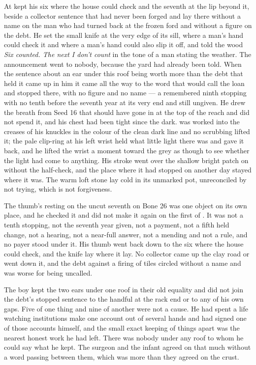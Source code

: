 At   kept his six where the house could check and the seventh at the lip beyond it, beside a collector sentence that had never been forged and lay there without a name on the man who had turned back at the frozen ford and without a figure on the debt. He set the small knife at the very edge of its sill, where a man's hand could check it and where a man's hand could also slip it off, and told the wood \emph{Six counted. The next I don't count} in the tone of a man stating the weather. The announcement went to nobody, because the yard had already been told. When the sentence about an ear under this roof being worth more than the debt that held it came up in him it came all the way to the word that would call the loan and stopped there, with no figure and no name --- a remembered ninth stopping with no tenth before the seventh year at its very end and still ungiven. He drew the breath from Seed 16 that should have gone in at the top of the reach and did not spend it, and his chest had been tight since the dark.  was worked into the creases of his knuckles in the colour of the clean dark line and no scrubbing lifted it; the pale clip-ring at his left wrist held what little light there was and gave it back, and he lifted the wrist a moment toward the grey as though to see whether the light had come to anything. His stroke went over the shallow bright patch on  without the half-check, and the place where it had stopped on another day stayed where it was. The warm loft stone lay cold in its unmarked pot, unreconciled by not trying, which is not forgiveness.

The thumb's resting on the uncut seventh on Bone 26 was one object on its own place, and he checked it and did not make it again on the first of . It was not a tenth stopping, not the seventh year given, not a payment, not a fifth held change, not a hearing, not a near-full answer, not a mending and not a rule, and no payer stood under it. His thumb went back down to the six where the house could check, and the knife lay where it lay. No collector came up the clay road or went down it, and the debt against a firing of tiles circled without a name and was worse for being uncalled.

The boy kept the two ears under one roof in their old equality and did not join the debt's stopped sentence to the handful at the rack end or to any of his own gaps. Five of one thing and nine of another were not a cause. He had spent a life watching institutions make one account out of several hands and had signed one of those accounts himself, and the small exact keeping of things apart was the nearest honest work he had left. There was nobody under any roof to whom he could say what he kept. The surgeon and the infant agreed on that much without a word passing between them, which was more than they agreed on the crust.

